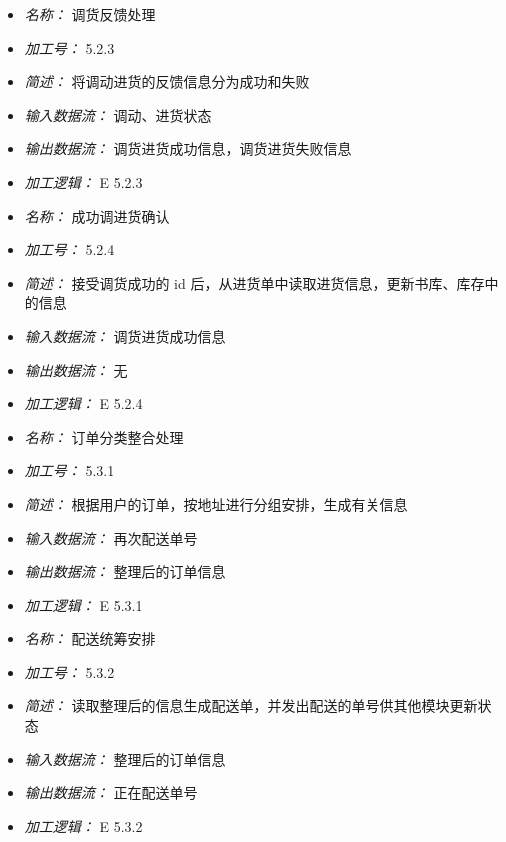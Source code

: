 \vspace{-1mm}


\begin{itemize}
\item \textit{名称： }调货反馈处理
\item \textit{加工号： }5.2.3
\item \textit{简述： } 将调动进货的反馈信息分为成功和失败 
\item \textit{输入数据流： } 调动、进货状态
\item \textit{输出数据流： } 调货进货成功信息，调货进货失败信息 
\item \textit{加工逻辑： } E 5.2.3

\end{itemize}


\vspace{-1mm}


\begin{itemize}
\item \textit{名称： }成功调进货确认
\item \textit{加工号： }5.2.4
\item \textit{简述： } 接受调货成功的 id 后，从进货单中读取进货信息，更新书库、库存中的信息 
\item \textit{输入数据流： } 调货进货成功信息
\item \textit{输出数据流： } 无
\item \textit{加工逻辑： } E 5.2.4

\end{itemize}


\vspace{-1mm}


\begin{itemize}
\item \textit{名称： }订单分类整合处理
\item \textit{加工号： }5.3.1
\item \textit{简述： } 根据用户的订单，按地址进行分组安排，生成有关信息 
\item \textit{输入数据流： } 再次配送单号
\item \textit{输出数据流： } 整理后的订单信息
\item \textit{加工逻辑： } E 5.3.1

\end{itemize}


\vspace{-1mm}


\begin{itemize}
\item \textit{名称： }配送统筹安排
\item \textit{加工号： }5.3.2
\item \textit{简述： } 读取整理后的信息生成配送单，并发出配送的单号供其他模块更新状态 
\item \textit{输入数据流： } 整理后的订单信息
\item \textit{输出数据流： } 正在配送单号
\item \textit{加工逻辑： } E 5.3.2

\end{itemize}


